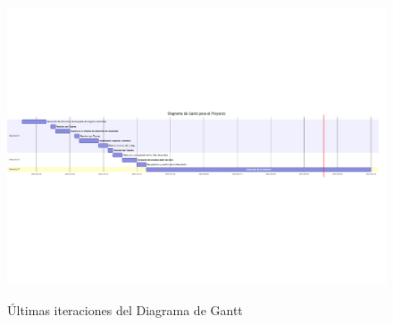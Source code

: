 \begin{figure}[h]
\centering
\includegraphics[width=15cm]{imaxes/gantt2.png}
\label{fig:pointnetc}
\caption{Últimas iteraciones del Diagrama de Gantt}
\end{figure}

